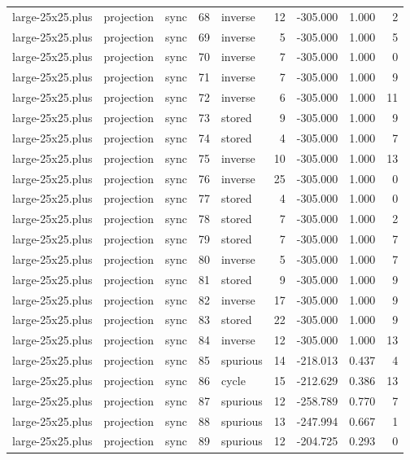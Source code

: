 \begin{tabular}{lllrlrrrr}
large-25x25.plus & projection & sync & 68 & inverse & 12 & -305.000 & 1.000 & 2 \\
large-25x25.plus & projection & sync & 69 & inverse & 5 & -305.000 & 1.000 & 5 \\
large-25x25.plus & projection & sync & 70 & inverse & 7 & -305.000 & 1.000 & 0 \\
large-25x25.plus & projection & sync & 71 & inverse & 7 & -305.000 & 1.000 & 9 \\
large-25x25.plus & projection & sync & 72 & inverse & 6 & -305.000 & 1.000 & 11 \\
large-25x25.plus & projection & sync & 73 & stored & 9 & -305.000 & 1.000 & 9 \\
large-25x25.plus & projection & sync & 74 & stored & 4 & -305.000 & 1.000 & 7 \\
large-25x25.plus & projection & sync & 75 & inverse & 10 & -305.000 & 1.000 & 13 \\
large-25x25.plus & projection & sync & 76 & inverse & 25 & -305.000 & 1.000 & 0 \\
large-25x25.plus & projection & sync & 77 & stored & 4 & -305.000 & 1.000 & 0 \\
large-25x25.plus & projection & sync & 78 & stored & 7 & -305.000 & 1.000 & 2 \\
large-25x25.plus & projection & sync & 79 & stored & 7 & -305.000 & 1.000 & 7 \\
large-25x25.plus & projection & sync & 80 & inverse & 5 & -305.000 & 1.000 & 7 \\
large-25x25.plus & projection & sync & 81 & stored & 9 & -305.000 & 1.000 & 9 \\
large-25x25.plus & projection & sync & 82 & inverse & 17 & -305.000 & 1.000 & 9 \\
large-25x25.plus & projection & sync & 83 & stored & 22 & -305.000 & 1.000 & 9 \\
large-25x25.plus & projection & sync & 84 & inverse & 12 & -305.000 & 1.000 & 13 \\
large-25x25.plus & projection & sync & 85 & spurious & 14 & -218.013 & 0.437 & 4 \\
large-25x25.plus & projection & sync & 86 & cycle & 15 & -212.629 & 0.386 & 13 \\
large-25x25.plus & projection & sync & 87 & spurious & 12 & -258.789 & 0.770 & 7 \\
large-25x25.plus & projection & sync & 88 & spurious & 13 & -247.994 & 0.667 & 1 \\
large-25x25.plus & projection & sync & 89 & spurious & 12 & -204.725 & 0.293 & 0 \\

\end{tabular}
